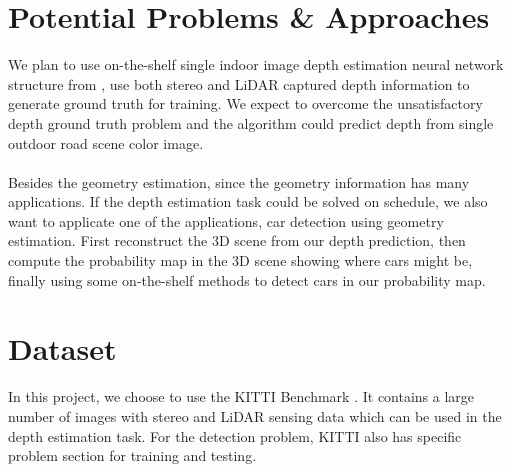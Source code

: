 \documentclass[a4paper]{article}
\begin{document}
\section{Potential Problems \& Approaches}
We plan to use on-the-shelf single indoor image depth estimation neural network structure from \cite{eigen2015predicting}, use both stereo and LiDAR captured depth information to generate ground truth for training. We expect to overcome the unsatisfactory depth ground truth problem and the algorithm could predict depth from single outdoor road scene color image.
\\\\
Besides the geometry estimation, since the geometry information has many applications. If the depth estimation task could be solved on schedule, we also want to applicate one of the applications, car detection using geometry estimation. First reconstruct the 3D scene from our depth prediction, then compute the probability map in the 3D scene showing where cars might be, finally using some on-the-shelf methods to detect cars in our probability map.
 
\section{Dataset}
In this project, we choose to use the KITTI Benchmark \cite{Geiger2013IJRR}\cite{Fritsch2013ITSC}\cite{Menze2015CVPR}. It contains a large number of images with stereo and LiDAR sensing data which can be used in the depth estimation task. For the detection problem, KITTI also has specific problem section for training and testing.



\end{document}
